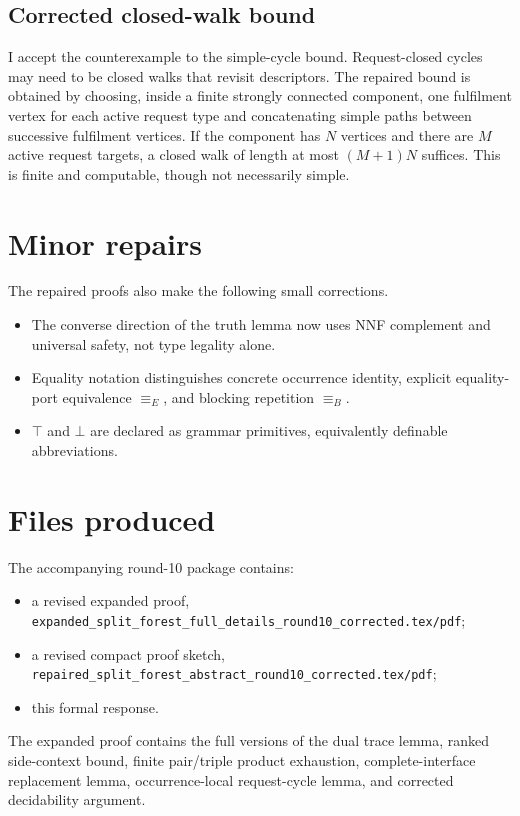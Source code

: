 \documentclass[11pt]{article}
\newcommand{\Eq}{\equiv_{\!E}}
\newcommand{\Blk}{\equiv_{\!B}}
\begin{document}
\subsection{Corrected closed-walk bound}

I accept the counterexample to the simple-cycle bound.  Request-closed cycles may need to be closed walks that revisit descriptors.  The repaired bound is obtained by choosing, inside a finite strongly connected component, one fulfilment vertex for each active request type and concatenating simple paths between successive fulfilment vertices.  If the component has $N$ vertices and there are $M$ active request targets, a closed walk of length at most $(M+1)N$ suffices.  This is finite and computable, though not necessarily simple.

\section{Minor repairs}

The repaired proofs also make the following small corrections.
\begin{itemize}
\item The converse direction of the truth lemma now uses NNF complement and universal safety, not type legality alone.
\item Equality notation distinguishes concrete occurrence identity, explicit equality-port equivalence $\Eq$, and blocking repetition $\Blk$.
\item $\top$ and $\bot$ are declared as grammar primitives, equivalently definable abbreviations.
\end{itemize}

\section{Files produced}

The accompanying round-10 package contains:
\begin{itemize}
\item a revised expanded proof, \texttt{expanded\_split\_forest\_full\_details\_round10\_corrected.tex/pdf};
\item a revised compact proof sketch, \texttt{repaired\_split\_forest\_abstract\_round10\_corrected.tex/pdf};
\item this formal response.
\end{itemize}
The expanded proof contains the full versions of the dual trace lemma, ranked side-context bound, finite pair/triple product exhaustion, complete-interface replacement lemma, occurrence-local request-cycle lemma, and corrected decidability argument.
\end{document}
